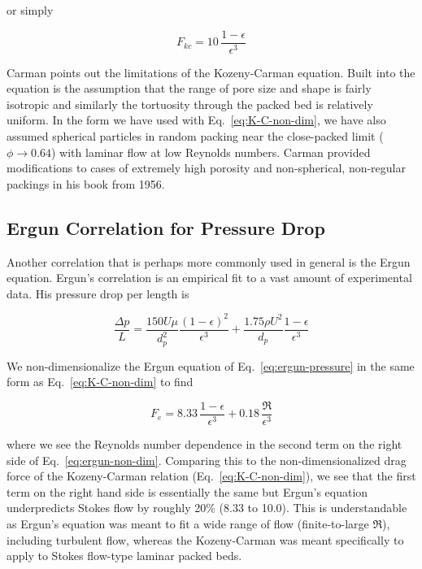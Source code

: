 or simply

\begin{equation}\label{eq:K-C-non-dim}
	F_{kc} = 10\, \frac{1-\epsilon}{\epsilon^3}
\end{equation}

Carman points out\cite{Carman1956} the limitations of the Kozeny-Carman equation. Built into the equation is the assumption that the range of pore size and shape is fairly isotropic and similarly the tortuosity through the packed bed is relatively uniform. In the form we have used with Eq.~\ref{eq:K-C-non-dim}, we have also assumed spherical particles in random packing near the close-packed limit ($\phi \rightarrow 0.64$) with laminar flow at low Reynolds numbers. Carman provided modifications to cases of extremely high porosity and non-spherical, non-regular packings in his book from 1956.\cite{Carman1956}

\subsection{Ergun Correlation for Pressure Drop}

Another correlation that is perhaps more commonly used in general is the Ergun equation.\cite{ergun1952fluid} Ergun's correlation is an empirical fit to a vast amount of experimental data. His pressure drop per length is 

\begin{equation}\label{eq:ergun-pressure}
	\frac{\Delta p}{L} = \frac{150 U \mu}{d_p^2} \frac{(1-\epsilon)^2}{\epsilon^3} + \frac{1.75 \rho U^2}{d_p}\frac{1-\epsilon}{\epsilon^3}
\end{equation}

We non-dimensionalize the Ergun equation of Eq.~\ref{eq:ergun-pressure} in the same form as Eq.~\ref{eq:K-C-non-dim} to find

\begin{equation}\label{eq:ergun-non-dim}
	F_e = 8.33 \, \frac{1-\epsilon}{\epsilon^3} + 0.18 \, \frac{\Re}{\epsilon^3}
\end{equation}

where we see the Reynolds number dependence in the second term on the right side of Eq.~\ref{eq:ergun-non-dim}. Comparing this to the non-dimensionalized drag force of the Kozeny-Carman relation (Eq.~\ref{eq:K-C-non-dim}), we see that the first term on the right hand side is essentially the same but Ergun's equation underpredicts Stokes flow by roughly 20\% (8.33 to 10.0). This is understandable as Ergun's equation was meant to fit a wide range of flow (finite-to-large $\Re$), including turbulent flow, whereas the Kozeny-Carman was meant specifically to apply to Stokes flow-type laminar packed beds.

